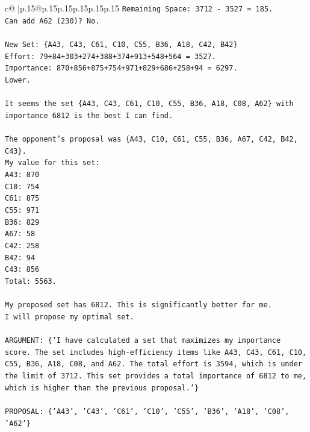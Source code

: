 \documentclass{article}
\begin{document}
{\begin{supertabular}{c@{$\;$}|p{.15\linewidth}@{}p{.15\linewidth}p{.15\linewidth}p{.15\linewidth}p{.15\linewidth}p{.15\linewidth}}
{{{\texttt{Remaining Space: 3712 {-} 3527 = 185.} \\
\texttt{Can add A62 (230)? No.} \\
\\ 
\texttt{New Set: \{A43, C43, C61, C10, C55, B36, A18, C42, B42\}} \\
\texttt{Effort: 79+84+303+274+388+374+913+548+564 = 3527.} \\
\texttt{Importance: 870+856+875+754+971+829+686+258+94 = 6297.} \\
\texttt{Lower.} \\
\\ 
\texttt{It seems the set \{A43, C43, C61, C10, C55, B36, A18, C08, A62\} with importance 6812 is the best I can find.} \\
\\ 
\texttt{The opponent's proposal was \{A43, C10, C61, C55, B36, A67, C42, B42, C43\}.} \\
\texttt{My value for this set:} \\
\texttt{A43: 870} \\
\texttt{C10: 754} \\
\texttt{C61: 875} \\
\texttt{C55: 971} \\
\texttt{B36: 829} \\
\texttt{A67: 58} \\
\texttt{C42: 258} \\
\texttt{B42: 94} \\
\texttt{C43: 856} \\
\texttt{Total: 5563.} \\
\\ 
\texttt{My proposed set has 6812. This is significantly better for me.} \\
\texttt{I will propose my optimal set.} \\
\\ 
\texttt{ARGUMENT: \{'I have calculated a set that maximizes my importance score. The set includes high{-}efficiency items like A43, C43, C61, C10, C55, B36, A18, C08, and A62. The total effort is 3594, which is under the limit of 3712. This set provides a total importance of 6812 to me, which is higher than the previous proposal.'\}} \\
\\ 
\texttt{PROPOSAL: \{'A43', 'C43', 'C61', 'C10', 'C55', 'B36', 'A18', 'C08', 'A62'\}} \\
            }
        }
    }
     \\ \\


\end{supertabular}}
\end{document}
